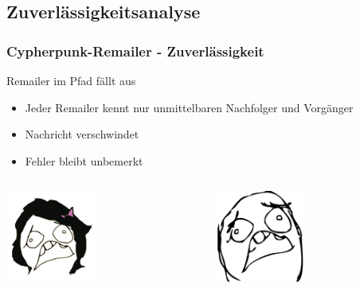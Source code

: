 \documentclass{beamer}
\begin{document}
\subsection{Zuverlässigkeitsanalyse}
\begin{frame}
	\frametitle{Cypherpunk-Remailer - Zuverlässigkeit}
	\begin{alertblock}{Remailer im Pfad fällt aus}	
		\begin{itemize}	
			\item Jeder Remailer kennt nur unmittelbaren Nachfolger und Vorgänger
			\item Nachricht verschwindet
			\item Fehler bleibt unbemerkt
		\end{itemize}	
	\end{alertblock}


	\begin{columns}[T]
		\begin{column}[T]{5cm}
			\begin{center}
				\includegraphics[height=3cm]{bilder/alice_sad.jpg}
			\end{center}
		\end{column}
		\begin{column}[T]{5cm}
			\begin{center}	
				\includegraphics[height=3cm]{bilder/bob_sad.jpg}
			\end{center}
		\end{column}
	\end{columns}	
\end{frame}
\end{document}
